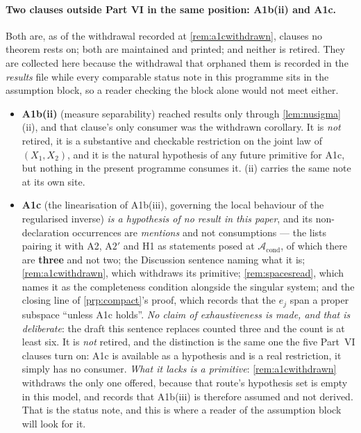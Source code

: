 \paragraph{Two clauses outside Part VI in the same position: A1b(ii) and A1c.}
Both are, as of the withdrawal recorded at \cref{rem:a1cwithdrawn}, clauses no theorem rests on;
both are maintained and printed; and neither is retired. They are collected here because the withdrawal
that orphaned them is recorded in the \emph{results} file while every comparable status note in this
programme sits in the assumption block, so a reader checking the block alone would not meet either.
\begin{itemize}
\item[--] \textbf{A1b(ii)} (measure separability) reached results only through
\cref{lem:nusigma}\textup{(ii)}, and that clause's only consumer was the withdrawn corollary. It is
\emph{not} retired, it is a substantive and checkable restriction on the joint law of $(X_1,X_2)$, and
it is the natural hypothesis of any future primitive for A1c, but nothing in the present programme
consumes it. \textup{(ii)} carries the same note at its own site.
\item[--] \textbf{A1c} (the linearisation of A1b(iii), governing the local behaviour of the regularised
inverse) \emph{is a hypothesis of no result in this paper}, and its non-declaration occurrences are
\emph{mentions} and not consumptions --- the lists pairing it with A2, A$2'$ and H1 as statements
posed at $\mathcal A_{\mathrm{cond}}$, of which there are \textbf{three} and not two; the Discussion
sentence naming what it is; \cref{rem:a1cwithdrawn}, which withdraws its primitive;
\cref{rem:spacesread}, which names it as the completeness condition alongside the singular system;
and the closing line of \cref{prp:compact}'s proof, which records that the $e_j$ span a proper
subspace ``unless A1c holds''. \emph{No claim of exhaustiveness is
made, and that is deliberate}: the draft this sentence replaces counted three and the count is at
least six. It is \emph{not}
retired, and the distinction is the same one the five Part~VI clauses turn on: A1c is available as a
hypothesis and is a real restriction, it simply has no consumer. \emph{What it lacks is a primitive}:
\cref{rem:a1cwithdrawn} withdraws the only one offered, because that route's hypothesis set is empty in
this model, and records that A1b(iii) is therefore assumed and not derived. That is the status
note, and this is where a reader of the assumption block will look for it.
\end{itemize}
